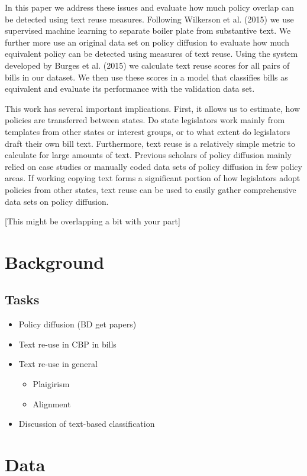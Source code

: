 \documentclass[12pt]{article} %
\begin{document}
In this paper we address these issues and evaluate how much policy overlap can
be detected using text reuse measures. Following Wilkerson et al. (2015) we use
supervised machine learning to separate boiler plate from substantive text. We
further more use an original data set on policy diffusion to evaluate how much
equivalent policy can be detected using measures of text reuse. Using the system
developed by Burges et al. (2015) we calculate text reuse scores for all pairs
of bills in our dataset. We then use these scores in a model that classifies
bills as equivalent and evaluate its performance with the validation data set. 

This work has several important implications. First, it allows us to estimate,
how policies are transferred between states. Do state legislators work mainly
from templates from other states or interest groups, or to what extent do
legislators draft their own bill text. Furthermore, text reuse is a relatively
simple metric to calculate for large amounts of text. Previous scholars of
policy diffusion mainly relied on case studies or manually coded data sets of
policy diffusion in few policy areas. If working copying text forms a
significant portion of how legislators adopt policies from other states, text
reuse can be used to easily gather comprehensive data sets on policy diffusion. 

[This might be overlapping a bit with your part]

\section{Background}

\subsection{Tasks}
\begin{itemize}
\item Policy diffusion (BD get papers)
\item Text re-use in CBP in bills 
\item Text re-use in general
\begin{itemize}
\item Plaigirism
\item Alignment
\end{itemize} 
\item Discussion of text-based classification
\end{itemize}

\section{Data}
\end{document}
